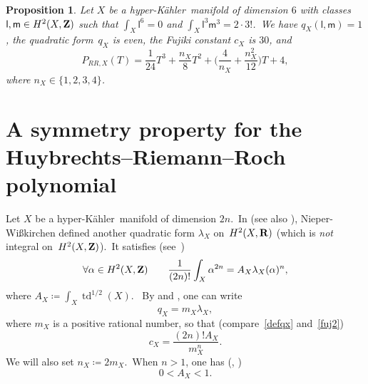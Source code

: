 \documentclass[12pt]{amsart}
\def\Z{{\bf Z}}
\def\R{{\bf R}}
\DeclareMathOperator{\td}{td}
\def\hk{hyper-K\"ahler}
\newtheorem{prop}[lemm]{Proposition}
\theoremstyle{remark}
\newtheorem{exam}[lemm]{Example}
\def\lll{\ensuremath{\mathsf l}}
\def\mm{\ensuremath{\mathsf m}}
\begin{document}
\begin{prop} 
Let $X$ be a \hk\ manifold of dimension $6$ with  classes $\lll,\mm\in H^2(X,\Z)$ such that
$
\int_X\lll^{6}=0$ and $\int_X\lll^3\mm^3=2\cdot 3!
$.\ We have $q_X(\lll,\mm)=1$, 
  the quadratic form~$q_X$ is even,  the Fujiki constant  $c_X$ is $30$, and
  $$P_{RR,X}(T)=
   \frac{1}{24}T^3+\frac{n_X}{8}T^2+
 \bigl(\frac{4}{n_X}+\frac{n_X^2}{12}\bigr)T
  +4,$$
  where $n_X \in\{1,2,3,4 \}$.
\end{prop}




 \section{A symmetry property for the Huybrechts--Riemann--Roch polynomial }\label{sec:intro}

 

Let $X$ be a \hk\ manifold of dimension $2n$.\  In \cite[Definition~17]{nw} (see also  \cite[Definition~2.2]{jia}), Nieper-Wi\ss kirchen defined another quadratic form $\lambda_X$ on~$H^2(X,\R)$ (which is {\em not} integral on~$H^2(X,\Z)$).\ It satisfies (see~\cite[(5.18)]{nw})
\begin{equation}\label{fuj2}
\forall \alpha\in H^2(X,\Z)\qquad \frac{1}{(2n)!} \int_X \alpha^{2n}=A_X \lambda_X(\alpha)^n,
\end{equation}
where $A_X\coloneqq\int_X\td^{1/2}(X)$.\ 
By \cite[Proposition~10]{nw} and \cite[Proposition~2.3]{jia}, one can write
\begin{equation*}%
q_X =m_X  \lambda_X,
\end{equation*}
where $m_X$ is a positive rational number, so that (compare~\eqref{defqx} and~\eqref{fuj2})
\begin{equation}\label{cxax}
c_X=\frac{(2n)!A_X}{m_X^n}. 
\end{equation}
We will also set $n_X\coloneqq 2m_X$.\ When $n>1$, one has (\cite[Section~6]{hs}, \cite[Corollary~5.5]{jia})
\begin{equation}\label{td121}
0< A_X <1.
\end{equation}


%
\end{document}
